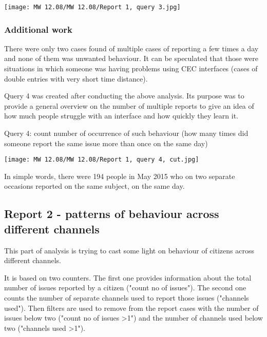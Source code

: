\begin{center}
  \texttt{[image: MW 12.08/MW 12.08/Report 1, query 3.jpg]}
  \label{normal_case}
\end{center}
	
			\subsubsection{Additional work}
			
There were only two cases found of multiple cases of reporting a few times a day and none of them was unwanted behaviour. It can be speculated that those were situations in which someone was having problems using CEC interfaces (cases of double entries with very short time distance).

Query 4 was created after conducting the above analysis. Its purpose was to provide a general overview on the number of multiple reports to give an idea of how much people struggle with an interface and how quickly they learn it.

Query 4: count number of occurrence of such behaviour (how many times did someone report the same issue more than once on the same day)

\begin{center}
  \texttt{[image: MW 12.08/MW 12.08/Report 1, query 4, cut.jpg]}
  \label{normal_case}
\end{center}



In simple words, there were 194 people in May 2015 who on two separate occasions reported on the same subject, on the same day.
			
		\subsection{Report 2 - patterns of behaviour across different channels}
		
This part of analysis is trying to cast some light on behaviour of citizens across different channels.

It is based on two counters. The first one provides information about the total number of issues reported by a citizen ("count no of issues"). The second one counts the number of separate channels used to report those issues ("channels used"). Then filters are used to remove from the report cases with the number of issues below two ("count no of issues \textgreater 1") and the number of channels used below two ("channels used \textgreater 1").

